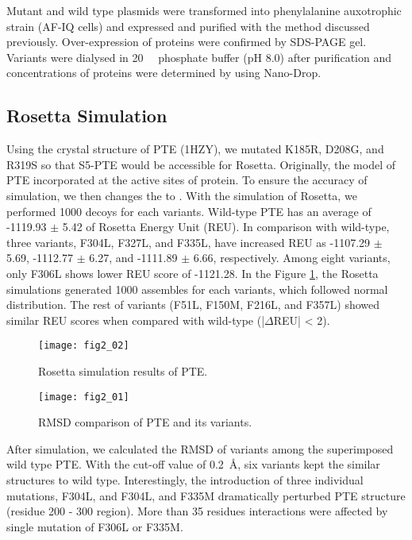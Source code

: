 \begin{refsection}
Mutant and wild type plasmids were transformed into 
phenylalanine auxotrophic strain (AF-IQ cells) and expressed and purified with
the method discussed  previously.\cite{Yang2014a} Over-expression of proteins
were confirmed by SDS-PAGE gel. Variants were dialysed in \SI{20}{\milli\Molar}
phosphate buffer (pH 8.0) after purification and concentrations of proteins
were determined by using Nano-Drop.

\subsection{Rosetta Simulation}

Using the crystal structure of PTE (1HZY), we mutated K185R, D208G, and R319S
so that S5-PTE would be accessible for Rosetta. Originally, the model of PTE
incorporated  at the active sites of protein. To ensure the accuracy
of simulation, we then changes the  to . With the
simulation of Rosetta, we performed 1000 decoys for each variants.  Wild-type
PTE has an average of -1119.93 $\pm$ 5.42 of Rosetta Energy Unit (REU). In
comparison with wild-type, three variants, F304L, F327L, and F335L, have
increased REU as -1107.29 $\pm$ 5.69, -1112.77 $\pm$ 6.27, and -1111.89 $\pm$
6.66, respectively. Among eight variants, only F306L shows lower REU score of
-1121.28. In the Figure \ref{fig:rosetta-pte-chap2}, the Rosetta simulations
generated 1000 assembles for each variants, which followed normal distribution.
The rest of variants (F51L, F150M, F216L, and F357L) showed similar REU scores
when compared with wild-type (|$\Delta$REU| < 2). 

\begin{figure}[h!] \centering \texttt{[image: fig2\_02]}
    \caption[Rosetta simulation results of PTE.]{Rosetta simulation results of PTE.}
    \label{fig:rosetta-pte-chap2}
\end{figure}
\begin{figure}[h!] \centering \texttt{[image: fig2\_01]}
    \caption[RMSD comparison of PTE and its variants.]{RMSD comparison of PTE
    and its variants.} 
    \label{fig:rmsd-pte-chap2}
\end{figure}
After simulation, we calculated the RMSD of variants among the superimposed
wild type PTE. With the cut-off value of \SI{0.2}{\AA}, six variants kept the
similar structures to wild type. Interestingly, the introduction of three
individual mutations, F304L, and F304L, and F335M dramatically perturbed PTE
structure (residue 200 - 300 region). More than 35 residues interactions were
affected by single mutation of F306L or F335M. 


\end{refsection}
